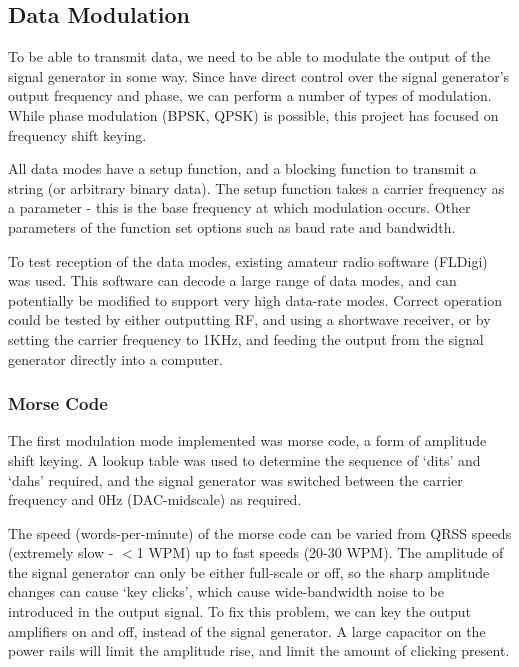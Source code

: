 \documentclass[a4paper,12pt]{article}
\begin{document}

\subsection{Data Modulation}
To be able to transmit data, we need to be able to modulate the output of the signal generator in some way. Since have direct control over the signal generator's output frequency and phase, we can perform a number of types of modulation. While phase modulation (BPSK, QPSK) is possible, this project has focused on frequency shift keying.

All data modes have a setup function, and a blocking function to transmit a string (or arbitrary binary data). The setup function takes a carrier frequency as a parameter - this is the base frequency at which modulation occurs. Other parameters of the function set options such as baud rate and bandwidth.

To test reception of the data modes, existing amateur radio software (FLDigi) was used. This software can decode a large range of data modes, and can potentially be modified to support very high data-rate modes. Correct operation could be tested by either outputting RF, and using a shortwave receiver, or by setting the carrier frequency to 1KHz, and feeding the output from the signal generator directly into a computer.

\subsubsection*{Morse Code}
The first modulation mode implemented was morse code, a form of amplitude shift keying. A lookup table was used to determine the sequence of `dits' and `dahs' required, and the signal generator was switched between the carrier frequency and 0Hz (DAC-midscale) as required.

The speed (words-per-minute) of the morse code can be varied from QRSS speeds (extremely slow - $<$1 WPM) up to fast speeds (20-30 WPM). The amplitude of the signal generator can only be either full-scale or off, so the sharp amplitude changes can cause `key clicks', which cause wide-bandwidth noise to be introduced in the output signal. To fix this problem, we can key the output amplifiers on and off, instead of the signal generator. A large capacitor on the power rails will limit the amplitude rise, and limit the amount of clicking present.
\end{document}
